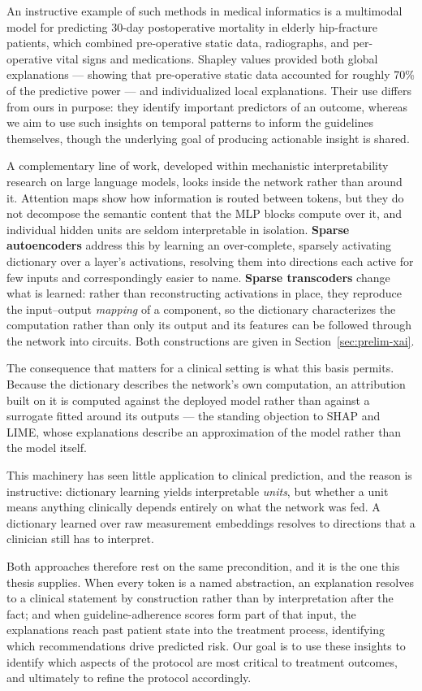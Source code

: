 An instructive example of such methods in medical informatics is a multimodal model \citep{feature-importance-explain-multimodal-prediction-models-clinical-use-case} for predicting 30-day postoperative mortality in elderly hip-fracture patients, which combined pre-operative static data, radiographs, and per-operative vital signs and medications. Shapley values provided both global explanations --- showing that pre-operative static data accounted for roughly 70\% of the predictive power --- and individualized local explanations. Their use differs from ours in purpose: they identify important predictors of an outcome, whereas we aim to use such insights on temporal patterns to inform the guidelines themselves, though the underlying goal of producing actionable insight is shared.

A complementary line of work, developed within mechanistic interpretability research on large language models, looks inside the network rather than around it. Attention maps show how information is routed between tokens, but they do not decompose the semantic content that the MLP blocks compute over it, and individual hidden units are seldom interpretable in isolation. \textbf{Sparse autoencoders} \citep{rajamanoharan2024jumping} address this by learning an over-complete, sparsely activating dictionary over a layer's activations, resolving them into directions each active for few inputs and correspondingly easier to name. \textbf{Sparse transcoders} \citep{dunefsky2024transcoders} change what is learned: rather than reconstructing activations in place, they reproduce the input--output \emph{mapping} of a component, so the dictionary characterizes the computation rather than only its output and its features can be followed through the network into circuits. Both constructions are given in Section~\ref{sec:prelim-xai}.

The consequence that matters for a clinical setting is what this basis permits. Because the dictionary describes the network's own computation, an attribution built on it is computed against the deployed model rather than against a surrogate fitted around its outputs --- the standing objection to SHAP and LIME, whose explanations describe an approximation of the model rather than the model itself.

This machinery has seen little application to clinical prediction, and the reason is instructive: dictionary learning yields interpretable \emph{units}, but whether a unit means anything clinically depends entirely on what the network was fed. A dictionary learned over raw measurement embeddings resolves to directions that a clinician still has to interpret.

Both approaches therefore rest on the same precondition, and it is the one this thesis supplies. When every token is a named abstraction, an explanation resolves to a clinical statement by construction rather than by interpretation after the fact; and when guideline-adherence scores form part of that input, the explanations reach past patient state into the treatment process, identifying which recommendations drive predicted risk. Our goal is to use these insights to identify which aspects of the protocol are most critical to treatment outcomes, and ultimately to refine the protocol accordingly.
